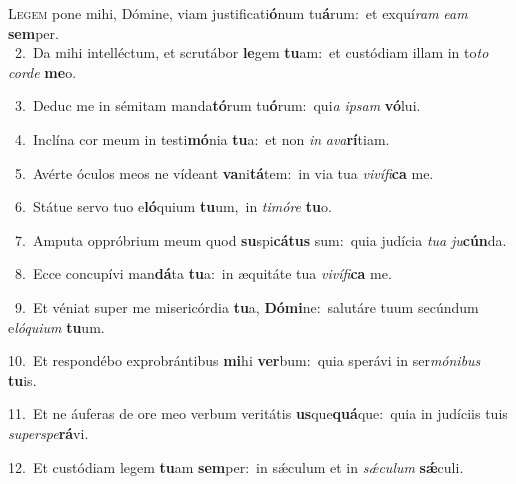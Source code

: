 \lettrine{\initial\textcolor{\initialcolor}{L}}{egem} pone mihi, Dómine, viam justificati\-\textbf{ó}\-num tu\-\textbf{á}\-rum:~\star et exquí\textit{ram} \textit{e}\-\textit{am} \textbf{sem}\-per.\\
{\numbfont\textcolor{\numbcolor}{~2.}}~Da mihi intelléctum, et scrutábor \textbf{le}\-gem \textbf{tu}\-am:~\star et custódiam illam in to\textit{to} \textit{cor}\-\textit{de} \textbf{me}\-o.\par
{\numbfont\textcolor{\numbcolor}{~3.}}~Deduc me in sémitam manda\-\textbf{tó}\-rum tu\-\textbf{ó}\-rum:~\star qui\textit{a} \textit{ip}\-\textit{sam} \textbf{vó}\-lui.\par
{\numbfont\textcolor{\numbcolor}{~4.}}~Inclína cor meum in testi\-\textbf{mó}\-nia \textbf{tu}\-a:~\star et non \textit{in} \textit{a}\-\textit{va}\textbf{rí}tiam.\par
{\numbfont\textcolor{\numbcolor}{~5.}}~Avérte óculos meos ne vídeant \textbf{va}\-ni\-\textbf{tá}\-tem:~\star in via tua \textit{vi}\-\textit{ví}\textit{fi}\textbf{ca} me.\par
{\numbfont\textcolor{\numbcolor}{~6.}}~Státue servo tuo e\-\textbf{ló}\-quium \textbf{tu}\-um,~\star in \textit{ti}\-\textit{mó}\textit{re} \textbf{tu}\-o.\par
{\numbfont\textcolor{\numbcolor}{~7.}}~Amputa oppróbrium meum quod \textbf{su}\-spi\-\textbf{cá}\-\textbf{tus} sum:~\star quia judícia \textit{tu}\-\textit{a} \textit{ju}\-\textbf{cún}da.\par
{\numbfont\textcolor{\numbcolor}{~8.}}~Ecce concupívi man\-\textbf{dá}\-ta \textbf{tu}\-a:~\star in æquitáte tua \textit{vi}\-\textit{ví}\textit{fi}\textbf{ca} me.\par
{\numbfont\textcolor{\numbcolor}{~9.}}~Et véniat super me misericórdia \textbf{tu}\-a, \textbf{Dó}\-\textbf{mi}ne:~\star salutáre tuum secúndum e\-\textit{ló}\-\textit{qui}\textit{um} \textbf{tu}\-um.\par
{\numbfont\textcolor{\numbcolor}{10.}}~Et respondébo exprobrántibus \textbf{mi}\-hi \textbf{ver}\-bum:~\star quia sperávi in ser\-\textit{mó}\-\textit{ni}\textit{bus} \textbf{tu}\-is.\par
{\numbfont\textcolor{\numbcolor}{11.}}~Et ne áuferas de ore meo verbum veritátis \textbf{us}\-que\-\textbf{quá}\-que:~\star quia in judíciis tuis \textit{su}\-\textit{per}\textit{spe}\textbf{rá}vi.\par
{\numbfont\textcolor{\numbcolor}{12.}}~Et custódiam legem \textbf{tu}\-am \textbf{sem}\-per:~\star in sǽculum et in \textit{sǽ}\-\textit{cu}\textit{lum} \textbf{sǽ}\-culi.\par
